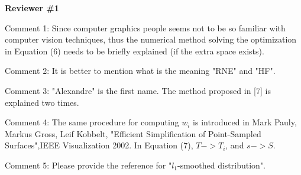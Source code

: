 \vspace{10pt}

\noindent
{\bf Reviewer \#1}

\vspace{10pt}

\noindent
Comment 1:
Since computer graphics people seems not to be so familiar with computer vision techniques, thus the numerical method solving the optimization in Equation (6) needs to be briefly explained (if the extra space exists).

\noindent
{}

\vspace{10pt}

\noindent
Comment 2: It is better to mention what is the meaning "RNE" and "HF".

\noindent
{}

\vspace{10pt}

\noindent
Comment 3: "Alexandre" is the first name. The method proposed in [7] is explained two times.

\noindent
{}

\vspace{10pt}

\noindent
Comment 4: The same procedure for computing $w_i$ is introduced in Mark Pauly, Markus Gross, Leif Kobbelt, "Efficient Simplification of Point-Sampled Surfaces",IEEE Visualization 2002. In Equation (7), $T->T_i$, and $s->S$.

\noindent
{}

\vspace{10pt}

\noindent
Comment 5: Please provide the reference for "$l_1$-smoothed distribution".

